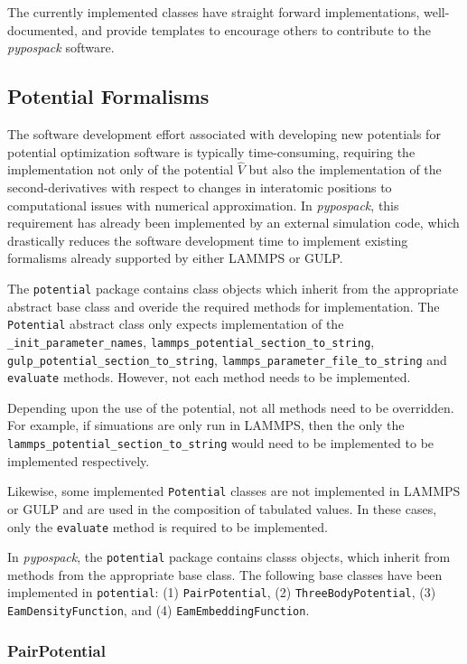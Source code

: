 The currently implemented classes have straight forward implementations, well-documented, and provide templates to encourage others to contribute to the \emph{pypospack} software.

\subsection{Potential Formalisms}

The software development effort associated with developing new potentials for potential optimization software is typically time-consuming, requiring the implementation not only of the potential $\hat{V}$ but also the implementation of the second-derivatives with respect to changes in interatomic positions to computational issues with numerical approximation.  In \emph{pypospack}, this requirement has already been implemented by an external simulation code, which drastically reduces the software development time to implement existing formalisms already supported by either LAMMPS or GULP.

The \verb|potential| package contains class objects which inherit from the appropriate abstract base class and overide the required methods for implementation.  The \verb|Potential| abstract class only expects implementation of the \verb|_init_parameter_names|, \verb|lammps_potential_section_to_string|, \verb|gulp_potential_section_to_string|, \verb|lammps_parameter_file_to_string| and \verb|evaluate| methods.  However, not each method needs to be implemented.

Depending upon the use of the potential, not all methods need to be overridden.  For example, if simuations are only run in LAMMPS, then the only the \verb|lammps_potential_section_to_string| would need to be implemented to be implemented respectively.

Likewise, some implemented \verb|Potential| classes are not implemented in LAMMPS or GULP and are used in the composition of tabulated values.  In these cases, only the \verb|evaluate| method is required to be implemented.

In \emph{pypospack}, the \verb|potential| package contains classs objects, which inherit from methods from the appropriate base class.  The following base classes have been implemented in \verb|potential|: (1) \verb|PairPotential|, (2) \verb|ThreeBodyPotential|, (3) \verb|EamDensityFunction|, and (4) \verb|EamEmbeddingFunction|.

\subsubsection{PairPotential}


